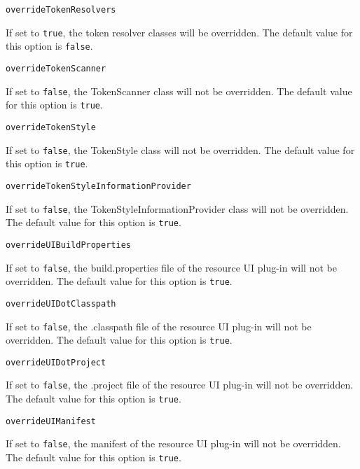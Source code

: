\noindent\texttt{overrideTokenResolvers}
\begin{myindentpar}{1cm}
If set to \texttt{true}, the token resolver classes will be overridden. The default value for this option is \texttt{false}.
\end{myindentpar}

\noindent\texttt{overrideTokenScanner}
\begin{myindentpar}{1cm}
If set to \texttt{false}, the TokenScanner class will not be overridden. The default value for this option is \texttt{true}.
\end{myindentpar}

\noindent\texttt{overrideTokenStyle}
\begin{myindentpar}{1cm}
If set to \texttt{false}, the TokenStyle class will not be overridden. The default value for this option is \texttt{true}.
\end{myindentpar}

\noindent\texttt{overrideTokenStyleInformationProvider}
\begin{myindentpar}{1cm}
If set to \texttt{false}, the TokenStyleInformationProvider class will not be overridden. The default value for this option is \texttt{true}.
\end{myindentpar}

\noindent\texttt{overrideUIBuildProperties}
\begin{myindentpar}{1cm}
If set to \texttt{false}, the build.properties file of the resource UI plug-in will not be overridden. The default value for this option is \texttt{true}.
\end{myindentpar}

\noindent\texttt{overrideUIDotClasspath}
\begin{myindentpar}{1cm}
If set to \texttt{false}, the .classpath file of the resource UI plug-in will not be overridden. The default value for this option is \texttt{true}.
\end{myindentpar}

\noindent\texttt{overrideUIDotProject}
\begin{myindentpar}{1cm}
If set to \texttt{false}, the .project file of the resource UI plug-in will not be overridden. The default value for this option is \texttt{true}.
\end{myindentpar}

\noindent\texttt{overrideUIManifest}
\begin{myindentpar}{1cm}
If set to \texttt{false}, the manifest of the resource UI plug-in will not be overridden. The default value for this option is \texttt{true}.
\end{myindentpar}


